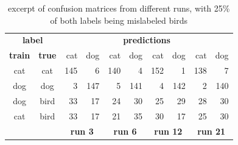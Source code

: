 \documentclass[a4paper,11pt]{scrartcl}
\theoremstyle{definition}
\begin{document}
\begin{table}[H]%
	\centering %
	\begin{tabular}{ c c | r r | r r | r r | r r } %
		\toprule %
		\multicolumn{2}{c}{\textbf{label}} & \multicolumn{8}{c}{\textbf{predictions}} \\ %
		\textbf{train}  & \textbf{true} &cat&dog&cat&dog&cat&dog&cat&dog\\
		\midrule %
		cat & cat& 145 & 6 & 140 & 4 & 152 & 1 & 138 & 7 \\
		dog & dog  & 3 & 147 & 5 & 141 & 4 & 142 & 2 & 140 \\
		dog & bird  & 33 & 17 & 24 & 30 & 25 & 29 & 28 & 30 \\
		cat & bird  & 33 & 17 & 21 & 35 & 30 & 17 & 25 & 30\\
		\midrule
		 & & \multicolumn{2}{c|}{\textbf{run 3}}& \multicolumn{2}{c|}{\textbf{run 6}}& \multicolumn{2}{c|}{\textbf{run 12}}& \multicolumn{2}{c}{\textbf{run 21}}\\
		\bottomrule %

	\end{tabular}
	\caption[Excerpt of confusion matrices]{excerpt of confusion matrices from different runs, with 25\% of both labels being mislabeled birds} %

	\label{tab:examples_against_bias} %
\end{table}
\end{document}
